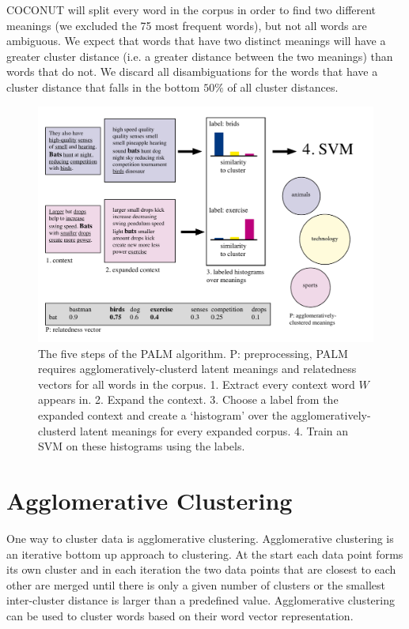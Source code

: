 \documentclass[11pt]{article}
\begin{document}
COCONUT will split every word in the corpus in order to find two different meanings (we excluded the 75 most frequent words), but not all words are ambiguous. We expect that words that have two distinct meanings will have a greater cluster distance (i.e. a greater distance between the two meanings) than words that do not. We discard all disambiguations for the words that have a cluster distance that falls in the bottom $50\%$ of all cluster distances.
\begin{figure}
\center
\includegraphics[scale=0.75]{images/palm.pdf}
\caption{The five steps of the PALM algorithm. P: preprocessing, PALM requires agglomeratively-clusterd latent meanings and relatedness vectors for all words in the corpus. 1. Extract every context word $W$ appears in. 2. Expand the context. 3. Choose a label from the expanded context and create a `histogram' over the agglomeratively-clusterd latent meanings for every expanded corpus. 4. Train an SVM on these histograms using the labels.}
\label{palmimg}
\end{figure}

\section{Agglomerative Clustering}
One way to cluster data is agglomerative clustering. Agglomerative clustering is an iterative bottom up approach to clustering. At the start each data point forms its own cluster and in each iteration the two data points that are closest to each other are merged until there is only a given number of clusters or the smallest inter-cluster distance is larger than a predefined value. Agglomerative clustering can be used to cluster words based on their word vector representation. 
\end{document}

